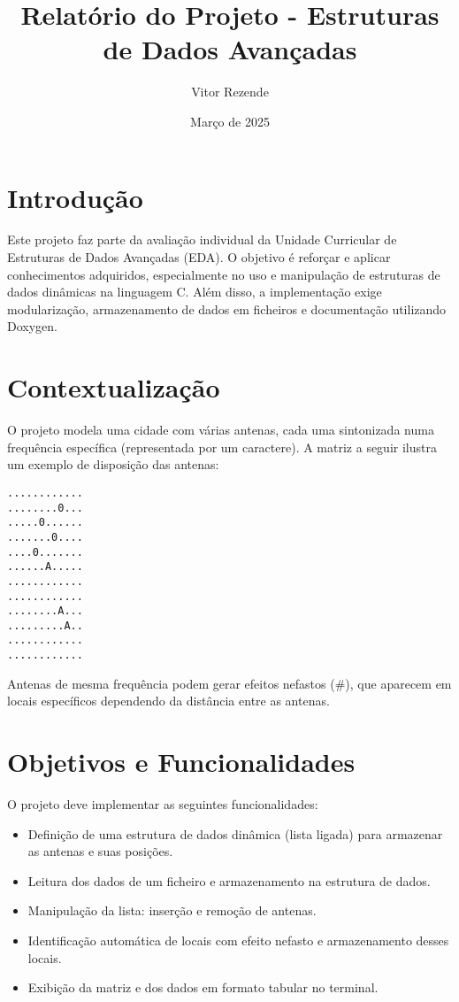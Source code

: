 \documentclass[a4paper,12pt]{article}
\title{Relatório do Projeto - Estruturas de Dados Avançadas}
\author{Vitor Rezende}
\date{Março de 2025}
\begin{document}
\maketitle
\newpage

\tableofcontents
\newpage

\section{Introdução}
Este projeto faz parte da avaliação individual da Unidade Curricular de Estruturas de Dados Avançadas (EDA). O objetivo é reforçar e aplicar conhecimentos adquiridos, especialmente no uso e manipulação de estruturas de dados dinâmicas na linguagem C. Além disso, a implementação exige modularização, armazenamento de dados em ficheiros e documentação utilizando Doxygen.

\newpage

\section{Contextualização}
O projeto modela uma cidade com várias antenas, cada uma sintonizada numa frequência específica (representada por um caractere). A matriz a seguir ilustra um exemplo de disposição das antenas:

\begin{verbatim}
............
........0...
.....0......
.......0....
....0.......
......A.....
............
............
........A...
.........A..
............
............
\end{verbatim}

Antenas de mesma frequência podem gerar efeitos nefastos (\#), que aparecem em locais específicos dependendo da distância entre as antenas.

\newpage

\section{Objetivos e Funcionalidades}
O projeto deve implementar as seguintes funcionalidades:
\begin{itemize}
    \item Definição de uma estrutura de dados dinâmica (lista ligada) para armazenar as antenas e suas posições.
    \item Leitura dos dados de um ficheiro e armazenamento na estrutura de dados.
    \item Manipulação da lista: inserção e remoção de antenas.
    \item Identificação automática de locais com efeito nefasto e armazenamento desses locais.
    \item Exibição da matriz e dos dados em formato tabular no terminal.
\end{itemize}
\end{document}
